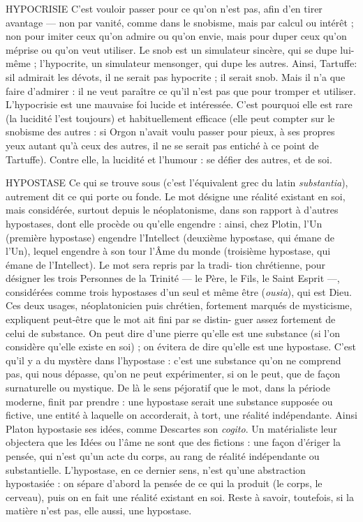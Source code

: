 HYPOCRISIE C’est vouloir passer pour ce qu’on n’est pas, afin d’en tirer
avantage — non par vanité, comme dans le snobisme, mais
par calcul ou intérêt ; non pour imiter ceux qu’on admire ou qu’on envie, mais
pour duper ceux qu’on méprise ou qu’on veut utiliser. Le snob est un simulateur
sincère, qui se dupe lui-même ; l’hypocrite, un simulateur mensonger, qui
dupe les autres. Ainsi, Tartuffe: sil admirait les dévots, il ne serait pas
hypocrite ; il serait snob. Mais il n’a que faire d’admirer : il ne veut paraître ce
qu’il n’est pas que pour tromper et utiliser. L’hypocrisie est une mauvaise foi
lucide et intéressée. C’est pourquoi elle est rare (la lucidité l’est toujours) et
habituellement efficace (elle peut compter sur le snobisme des autres : si Orgon
n'avait voulu passer pour pieux, à ses propres yeux autant qu’à ceux des autres,
il ne se serait pas entiché à ce point de Tartuffe). Contre elle, la lucidité et
l'humour : se défier des autres, et de soi.

HYPOSTASE Ce qui se trouve sous (c’est l'équivalent grec du latin {\it substantia}),
autrement dit ce qui porte ou fonde. Le mot désigne
une réalité existant en soi, mais considérée, surtout depuis le néoplatonisme,
dans son rapport à d’autres hypostases, dont elle procède ou qu’elle engendre :
ainsi, chez Plotin, l’Un (première hypostase) engendre l’Intellect (deuxième
hypostase, qui émane de l’Un), lequel engendre à son tour l'Âme du monde
(troisième hypostase, qui émane de l’Intellect). Le mot sera repris par la tradi-
tion chrétienne, pour désigner les trois Personnes de la Trinité — le Père, le Fils,
le Saint Esprit —, considérées comme trois hypostases d’un seul et même être
({\it ousia}), qui est Dieu. Ces deux usages, néoplatonicien puis chrétien, fortement
marqués de mysticisme, expliquent peut-être que le mot ait fini par se distin-
guer assez fortement de celui de substance. On peut dire d’une pierre qu’elle est
une substance (si l’on considère qu’elle existe en soi) ; on évitera de dire qu’elle
est une hypostase. C’est qu’il y a du mystère dans l’hypostase : c’est une substance
qu'on ne comprend pas, qui nous dépasse, qu’on ne peut expérimenter,
si on le peut, que de façon surnaturelle ou mystique. De là le sens péjoratif que
le mot, dans la période moderne, finit par prendre : une hypostase serait une
substance supposée ou fictive, une entité à laquelle on accorderait, à tort, une
réalité indépendante. Ainsi Platon hypostasie ses idées, comme Descartes son
{\it cogito}. Un matérialiste leur objectera que les Idées ou l’âme ne sont que des
fictions : une façon d’ériger la pensée, qui n’est qu’un acte du corps, au rang de
réalité indépendante ou substantielle. L’hypostase, en ce dernier sens, n’est
qu'une abstraction hypostasiée : on sépare d’abord la pensée de ce qui la produit
(le corps, le cerveau), puis on en fait une réalité existant en soi. Reste à
savoir, toutefois, si la matière n’est pas, elle aussi, une hypostase.


